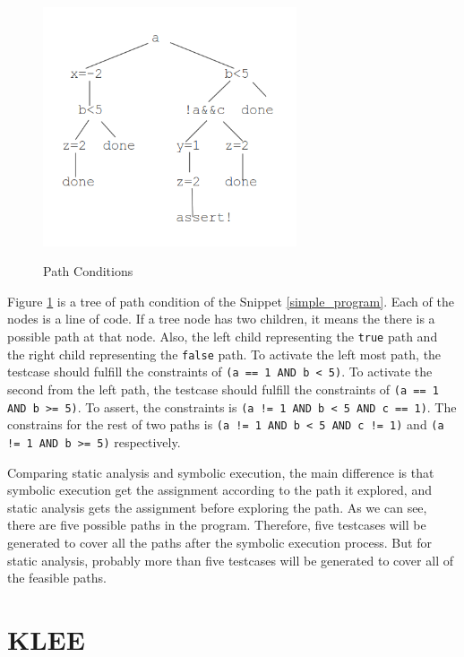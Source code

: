 \begin{figure}[h]%
\begin{center}
{\mbox{\includegraphics[height=200pt]{figures/path_tree.png}}}
\end{center}
\caption{\label{path_tree}Path Conditions}
\end{figure}

Figure \ref{path_tree} is a tree of path condition of the Snippet \ref{simple_program}. Each of the nodes is a line of code. If a tree node has two children, it means the there is a possible path at that node. Also, the left child representing the \texttt{true} path and the right child representing the \texttt{false} path. To activate the left most path, the testcase should fulfill the constraints of \texttt{(a == 1 AND b < 5)}. To activate the second from the left path, the testcase should fulfill the constraints of \texttt{(a == 1 AND b >= 5)}. To assert, the constraints is \texttt{(a != 1 AND b < 5 AND c == 1)}. The constrains for the rest of two paths is \texttt{(a != 1 AND b < 5 AND c != 1)} and \texttt{(a != 1 AND b >= 5)} respectively.

Comparing static analysis and symbolic execution, the main difference is that symbolic execution get the assignment according to the path it explored, and static analysis gets the assignment before exploring the path. As we can see, there are five possible paths in the program. Therefore, five testcases will be generated to cover all the paths after the symbolic execution process. But for static analysis, probably more than five testcases will be generated to cover all of the feasible paths.

\section{KLEE}

